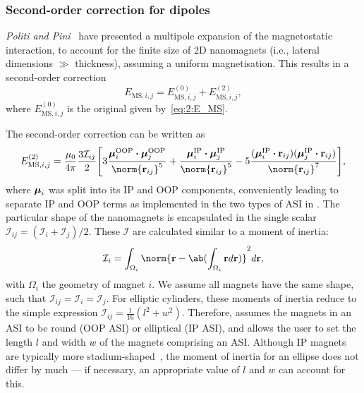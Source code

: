\subsubsection{Second-order correction for dipoles}
\textit{Politi and Pini}~\cite{Dipolar2Dparticles} have presented a multipole expansion of the magnetostatic interaction, to account for the finite size of 2D nanomagnets (i.e., lateral dimensions $\gg$ thickness), assuming a uniform magnetisation.
This results in a second-order correction
\begin{equation}
	E_{\mathrm{MS},i,j} = E_{\mathrm{MS},i,j}^\mathrm{(0)} + E_{\mathrm{MS},i,j}^\mathrm{(2)} \mathrm{,}
\end{equation}
where $E_{\mathrm{MS},i,j}^\mathrm{(0)}$ is the original   given by~\cref{eq:2:E_MS}. \par
The second-order correction can be written as
\begin{equation}
	\label{eq:2:E_MS_order2}
	E_{\mathrm{MS},i,j}^\mathrm{(2)} = \frac{\mu_0}{4\pi} \frac{3\mathcal{I}_{ij}}{2} \Bigg[3\frac{\vc{\mu}_i^\mathrm{OOP} \bcdot \vc{\mu}_j^\mathrm{OOP}}{\norm{\vc{r}_{ij}}^5} + \frac{\vc{\mu}_i^\mathrm{IP} \bcdot \vc{\mu}_j^\mathrm{IP}}{\norm{\vc{r}_{ij}}^5} -5\frac{(\vc{\mu}_i^\mathrm{IP} \bcdot \vc{r}_{ij}) (\vc{\mu}_j^\mathrm{IP} \bcdot \vc{r}_{ij})}{\norm{\vc{r}_{ij}}^7} \Bigg] \mathrm{,}
\end{equation}
where $\boldsymbol{\mathbf{\mu}}_i$ was split into its IP and OOP components, conveniently leading to separate IP and OOP terms as implemented in the two types of ASI in \hotspice.
The particular shape of the nanomagnets is encapsulated in the single scalar $\mathcal{I}_{ij} = (\mathcal{I}_i + \mathcal{I}_j)/2$.
These $\mathcal{I}$ are calculated similar to a moment of inertia:
\begin{equation}
	\mathcal{I}_i = \int_{\Omega_i} \norm{\vc{r} - \ab(\int_{\Omega_i} \vc{r} d\vc{r})}^2 d\vc{r} \mathrm{,}
\end{equation}
with $\Omega_i$ the geometry of magnet $i$.
We assume all magnets have the same shape, such that $\mathcal{I}_{ij} = \mathcal{I}_i = \mathcal{I}_j$.
For elliptic cylinders, these moments of inertia reduce to the simple expression $\mathcal{I}_{ij} = \frac{1}{16}(l^2 + w^2)$.
Therefore, \hotspice assumes the magnets in an ASI to be round (OOP ASI) or elliptical (IP ASI), and allows the user to set the length $l$ and width $w$ of the magnets comprising an ASI.
Although IP magnets are typically more stadium-shaped~\cite{EmergentChiralityRatchet,clocking-protocol}, the moment of inertia for an ellipse does not differ by much --- if necessary, an appropriate value of $l$ and $w$ can account for this.

